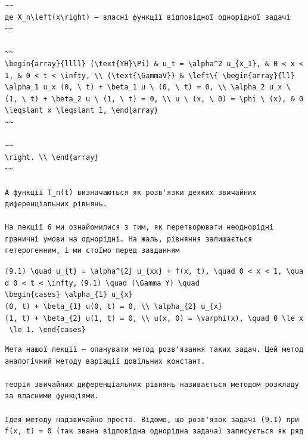 \documentclass[
  ukrainian,
]{article}
\begin{document}
\begin{verbatim}
~~
де X_n\left(x\right) — власні функції відповідної однорідної задачі
~~

~~
\begin{array}{llll} (\text{YH}\Pi) & u_t = \alpha^2 u_{x_1}, & 0 < x < 1, & 0 < t < \infty, \\ (\text{\GammaV}) & \left\{ \begin{array}{ll} \alpha_1 u_x (0, \ t) + \beta_1 u \ (0, \ t) = 0, \\ \alpha_2 u_x \ (1, \ t) + \beta_2 u \ (1, \ t) = 0, \\ u \ (x, \ 0) = \phi \ (x), & 0 \leqslant x \leqslant 1, \end{array}
~~

~~
\right. \\ \end{array}
~~

А функції T_n(t) визначаються як розв'язки деяких звичайних диференціальних рівнянь.

На лекції 6 ми ознайомилися з тим, як перетворювати неоднорідні граничні умови на однорідні. На жаль, рівняння залишається гетерогенним, і ми стоїмо перед завданням
\end{verbatim}

\texttt{(9.1)\ \textbackslash{}quad\ u\_\{t\}\ =\ \textbackslash{}alpha\^{}\{2\}\ u\_\{xx\}\ +\ f(x,\ t),\ \textbackslash{}quad\ 0\ \textless{}\ x\ \textless{}\ 1,\ \textbackslash{}quad\ 0\ \textless{}\ t\ \textless{}\ \textbackslash{}infty,}
\texttt{(9.1)\ \textbackslash{}quad\ (\textbackslash{}Gamma\ Y)\ \textbackslash{}quad}
\texttt{\textbackslash{}begin\{cases\}\ \textbackslash{}alpha\_\{1\}\ u\_\{x\}(0,\ t)\ +\ \textbackslash{}beta\_\{1\}\ u(0,\ t)\ =\ 0,\ \textbackslash{}\textbackslash{}\ \textbackslash{}alpha\_\{2\}\ u\_\{x\}(1,\ t)\ +\ \textbackslash{}beta\_\{2\}\ u(1,\ t)\ =\ 0,\ \textbackslash{}\textbackslash{}\ u(x,\ 0)\ =\ \textbackslash{}varphi(x),\ \textbackslash{}quad\ 0\ \textbackslash{}le\ x\ \textbackslash{}le\ 1.\ \textbackslash{}end\{cases\}}

\begin{verbatim}
Мета нашої лекції — опанувати метод розв'язання таких задач. Цей метод аналогічний методу варіації довільних констант.

теорія звичайних диференціальних рівнянь називається методом розкладу за власними функціями.

Ідея методу надзвичайно проста. Відомо, що розв'язок задачі (9.1) при f(x, t) = 0 (так звана відповідна однорідна задача) записується як ряд
\end{verbatim}
\end{document}
